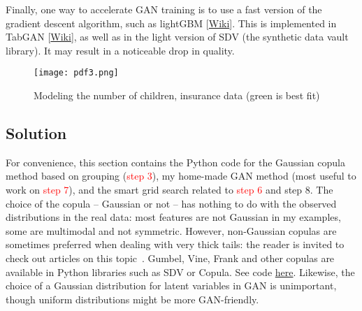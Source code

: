 \documentclass[oneside,10pt]{book}
\begin{document}
Finally, one way to accelerate GAN training is to use a fast version of the gradient descent algorithm, such as 
\textcolor{index}{lightGBM} [\href{https://en.wikipedia.org/wiki/LightGBM}{Wiki}]. This is implemented 
in \textcolor{index}{TabGAN} [\href{https://github.com/Diyago/GAN-for-tabular-data}{Wiki}],
as well as in the 
 light version of \textcolor{index}{SDV} (the synthetic data vault library). It may result in a noticeable drop in quality.

\begin{figure}[H]
\centering
\texttt{[image: pdf3.png]}   
\caption{Modeling the number of children, insurance data (green is best fit)}
\label{fig:gretfg1009}
\end{figure}

\subsection{Solution}

For convenience, this section contains the Python code for the Gaussian copula method based on grouping (\textcolor{red}{step 3}), my home-made GAN method
 (most useful to work on \textcolor{red}{step 7}), and the smart grid search related to \textcolor{red}{step 6} and \textcolor{index}{step 8}. The choice of the copula -- Gaussian or not -- has nothing to do with the observed distributions in the real data: most features are not Gaussian in my examples, some are multimodal and not symmetric. 
However, non-Gaussian copulas are sometimes preferred when dealing with very thick tails: the reader is invited to check out articles 
on this topic~\cite{copul22eg}. 
Gumbel, Vine, Frank and other copulas are available in Python libraries such as \textcolor{index}{SDV} or \textcolor{index}{Copula}.
 See code \href{https://github.com/VincentGranville/Main/blob/main/copula.py}{here}.  Likewise, the choice of a Gaussian distribution
 for latent variables in GAN is unimportant, though uniform distributions might be more GAN-friendly.
\end{document}
